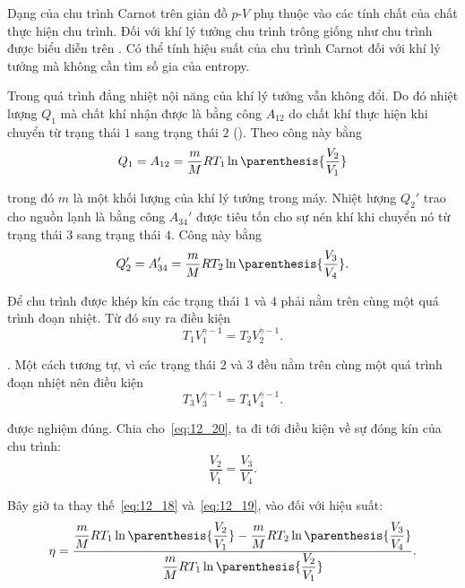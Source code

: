 Dạng của chu trình Carnot trên giản đồ $p$-$V$ phụ thuộc vào các tính chất của chất thực hiện chu trình. Đối với khí lý tưởng chu trình trông giống như chu trình được biểu diễn trên . Có thể tính hiệu suất của chu trình Carnot đối với khí lý tưởng mà không cần tìm số gia của entropy.

Trong quá trình đẳng nhiệt nội năng của khí lý tưởng vẫn không đổi. Do đó nhiệt lượng $Q_1$ mà chất khí nhận được là bằng công $A_{12}$ do chất khí thực hiện khi chuyển từ trạng thái $1$ sang trạng thái $2$ (). Theo  công này bằng
\begin{equation}\label{eq:12_18}
	Q_1 = A_{12} = \frac{m}{M}RT_1 \ln\parenthesis{\frac{V_2}{V_1}}
\end{equation}

\noindent
trong đó $m$ là một khối lượng của khí lý tưởng trong máy. Nhiệt lượng $Q_2'$ trao cho nguồn lạnh là bằng công $A_{34}'$ được tiêu tốn cho sự nén khí khi chuyển nó từ trạng thái $3$ sang trạng thái $4$. Công này bằng
\begin{equation}\label{eq:12_19}
	Q_2' = A_{34}' = \frac{m}{M}RT_2 \ln\parenthesis{\frac{V_3}{V_4}}.
\end{equation}

Để chu trình được khép kín các trạng thái $1$ và $4$ phải nằm trên cùng một quá trình đoạn nhiệt. Từ đó suy ra điều kiện
\begin{equation}\label{eq:12_20}
	T_1 V_1^{\gamma-1} = T_2 V_2^{\gamma-1}.
\end{equation}

. Một cách tương tự, vì các trạng thái $2$ và $3$ đều nằm trên cùng một quá trình đoạn nhiệt nên điều kiện
\begin{equation}\label{eq:12_21}
	T_3 V_3^{\gamma-1} = T_4 V_4^{\gamma-1}.
\end{equation}

\noindent
được nghiệm đúng. Chia  cho~\eqref{eq:12_20}, ta đi tới điều kiện về sự đóng kín của chu trình:
\begin{equation}\label{eq:12_22}
	\frac{V_2}{V_1} = \frac{V_3}{V_4}.
\end{equation}

Bây giờ ta thay thế~\eqref{eq:12_18} và~\eqref{eq:12_19}, vào  đối với hiệu suất:
\begin{equation*}
	\eta = \frac{\dfrac{m}{M}RT_1\ln\parenthesis{\dfrac{V_2}{V_1}} - \dfrac{m}{M}RT_2\ln\parenthesis{\dfrac{V_3}{V_4}}}{\dfrac{m}{M}RT_1\ln\parenthesis{\dfrac{V_2}{V_1}}}.
\end{equation*}

